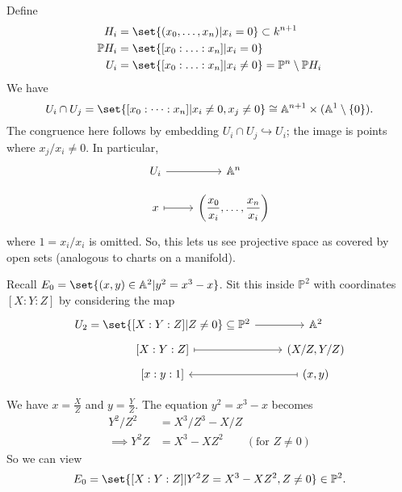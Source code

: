 \documentclass{article}
\newcommand{\A}{\mathbb{A}}
\newcommand{\proj}{\mathbb{P}}
\begin{document}
Define
\begin{align*}
    H_i       &= \set{(x_0, \dotsc, x_n) | x_i = 0} \subset k^{n+1} \\
    \proj H_i &= \set{[x_0: \dotsc: x_n] | x_i = 0} \\
    U_i       &= \set{[x_0: \dotsc: x_n] | x_i \neq 0} = \proj^n \setminus \proj H_i
\end{align*}
We have
\begin{equation*}U_i \cap U_j = \set{[x_0:\dotsm:x_n] | x_i \neq 0, x_j \neq 0} \cong \A^{n+1} \times (\A^1 \setminus \{0\}).\end{equation*}
The congruence here follows by embedding $U_i \cap U_j \hookrightarrow U_i$; the image is points where $x_j/x_i \neq 0$.
In particular,
\begin{equation*}
    \begin{tikzcd}[row sep=small]
        U_i \rar["~"] & \A^n \\
        x \rar[mapsto] & \left(\dfrac{x_0}{x_i}, \dotsc, \dfrac{x_n}{x_i}\right)
    \end{tikzcd}
\end{equation*}
where $1=x_i/x_i$ is omitted.
So, this lets us see projective space as covered by open sets (analogous to charts on a manifold).
\color{black}
Recall $E_0 = \set{(x, y) \in \A^2 | y^2 = x^3 - x}$. Sit this inside $\proj^2$ with coordinates $[X:Y:Z]$ by considering the map
\begin{equation*}
    \begin{tikzcd}[row sep=tiny]
        U_2 = \set{[X:Y:Z] | Z \neq 0} \subseteq \proj^2 \rar["~"] & \A^2 \\
        {[X:Y:Z]} \rar[mapsto] & (X/Z, Y/Z) \\
        {[x:y:1]} \rar[mapsfrom] & (x,y)
    \end{tikzcd}
\end{equation*}

We have $x = \frac{X}{Z}$ and $y=\frac{Y}{Z}$.
The equation $y^2 = x^3 - x$ becomes
\begin{align*}
    Y^2/Z^2 &= X^3 / Z^3 - X/Z \\
    \implies Y^2 Z &= X^3 - XZ^2 \qquad (\text{for } Z \neq 0)
\end{align*}
So we can view
\begin{equation*}
E_0 = \set{[X:Y:Z] | Y^2 Z = X^3 - X Z^2, Z \neq 0} \in \proj^2.
\end{equation*}
\end{document}
